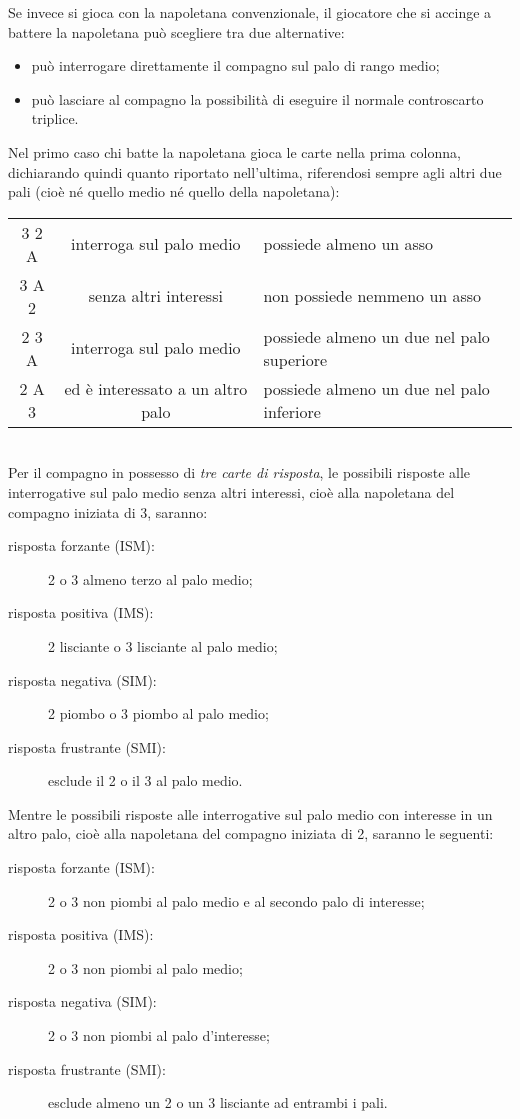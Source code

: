\documentclass[italian,a4paper]{article}
\newenvironment{packeditem}{
\begin{itemize}
  \setlength{\itemsep}{1pt}
  \setlength{\parskip}{0pt}
  \setlength{\parsep}{0pt}
}{\end{itemize}}
\begin{document}
Se invece si gioca con la napoletana convenzionale, il giocatore che si accinge a battere la napoletana può scegliere tra due alternative:
\begin{packeditem}
    \item può interrogare direttamente il compagno sul palo di rango medio;
    \item può lasciare al compagno la possibilità di eseguire il normale controscarto triplice.
\end{packeditem}
Nel primo caso chi batte la napoletana gioca le carte nella prima
colonna, dichiarando quindi quanto riportato nell'ultima, riferendosi
sempre agli altri due pali (cioè n\'e quello medio n\'e quello della
napoletana):
\begin{table}[h]
    \centering
    \begin{tabular}{ccl}
        3 2 A & interroga sul palo medio &  possiede almeno un asso\\
        3 A 2 & senza altri interessi & non possiede nemmeno un asso\\\hline
        2 3 A & interroga sul palo medio  &possiede almeno un due nel palo superiore\\
        2 A 3 & ed è interessato a un altro palo & possiede almeno un due nel palo inferiore\\
    \end{tabular}
\end{table}\\
Per il compagno in possesso di \emph{tre carte di risposta}, le possibili risposte alle interrogative sul palo medio senza altri interessi, cioè alla napoletana del compagno iniziata di 3, saranno:
\begin{description}
    \item[risposta forzante (ISM):] 2 o 3 almeno terzo al palo medio;
    \item[risposta positiva (IMS):] 2 lisciante o 3 lisciante al palo
        medio;
    \item[risposta negativa (SIM):] 2 piombo o 3 piombo al palo medio;
    \item[risposta frustrante (SMI):] esclude il 2 o il 3 al palo medio.
\end{description}
Mentre le possibili risposte alle interrogative sul palo medio con interesse in un altro palo, cioè alla napoletana del compagno iniziata di 2,  saranno le seguenti:
\begin{description}
    \item[risposta forzante (ISM):] 2 o 3 non piombi al palo medio e al
        secondo palo di interesse;
    \item[risposta positiva (IMS):] 2 o 3 non piombi al palo medio;
    \item[risposta negativa (SIM):]  2 o 3 non piombi al palo
        d'interesse;
    \item[risposta frustrante (SMI):] esclude almeno un 2 o un 3
        lisciante ad entrambi i pali.
\end{description}
\end{document}
